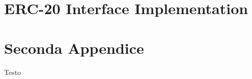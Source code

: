 \renewcommand{\chaptermark}[1]{\markright{\thechapter \ #1}{}}
\lhead[\fancyplain{}{\bfseries\thepage}]{\fancyplain{}{\bfseries\rightmark}}
\appendix                               %
\chapter{ERC-20 Interface Implementation}               %
\label{appendix:ERC-20Interface}




\chapter{Seconda Appendice}             %
Testo
